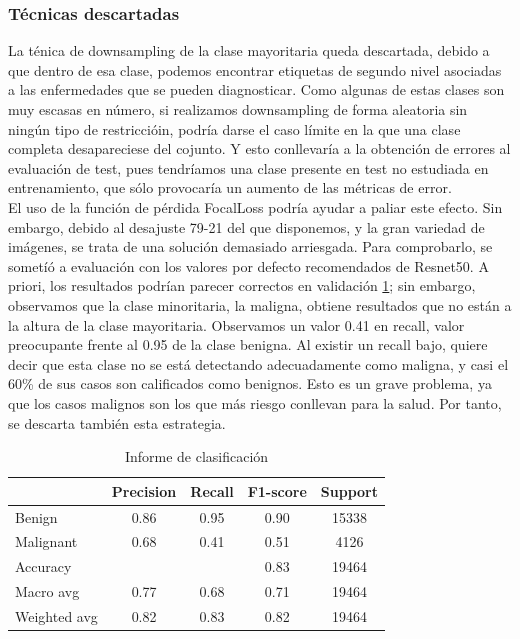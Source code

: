 \subsubsection{Técnicas descartadas}

La ténica de downsampling de la clase mayoritaria queda descartada, debido a que dentro de esa clase, podemos encontrar etiquetas de segundo nivel asociadas a las enfermedades que se pueden diagnosticar. Como algunas de estas clases son muy escasas en número, si realizamos downsampling de forma aleatoria sin ningún tipo de restriccióin, podría darse el caso límite en la que una clase completa desapareciese del cojunto. Y esto conllevaría a la obtención de errores al evaluación de test, pues tendríamos una clase presente en test no estudiada en entrenamiento, que sólo provocaría un aumento de las métricas de error. \\

El uso de la función de pérdida FocalLoss podría ayudar a paliar este efecto. Sin embargo, debido al desajuste 79-21 del que disponemos, y la gran variedad de imágenes, se trata de una solución demasiado arriesgada. Para comprobarlo, se sometíó a evaluación con los valores por defecto recomendados de Resnet50. A priori, los resultados podrían parecer correctos en validación \ref{tab:resultsfl}; sin embargo, observamos que la clase minoritaria, la maligna, obtiene resultados que no están a la altura de la clase mayoritaria. Observamos un valor 0.41 en recall, valor preocupante frente al 0.95 de la clase benigna. Al existir un recall bajo, quiere decir que esta clase no se está detectando adecuadamente como maligna, y casi el 60\% de sus casos son calificados como benignos. Esto es un grave problema, ya que los casos malignos son los que más riesgo conllevan para la salud. Por tanto, se descarta también esta estrategia.


\begin{table}[!ht]
	\centering
	\begin{tabular}{|l|c|c|c|c|}
		\hline
		& Precision & Recall & F1-score & Support \\
		\hline
		Benign & 0.86 & 0.95 & 0.90 & 15338 \\
		Malignant & 0.68 & 0.41 & 0.51 & 4126 \\
		\hline
		Accuracy &  &  & 0.83 & 19464 \\
		Macro avg & 0.77& 0.68& 0.71&19464\\
		Weighted avg&0.82&0.83&0.82&19464\\
		\hline
	\end{tabular}
	\caption{Informe de clasificación}
	\label{tab:resultsfl}
\end{table}

